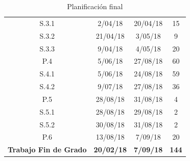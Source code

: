 \begin{table}[H]
\begin{tabular}{cccc}
\rowcolor[HTML]{FFFC9E} 
{\color[HTML]{333333} S.3.1}                                    & {\color[HTML]{333333} 2/04/18}           & {\color[HTML]{333333} 20/04/18}         & {\color[HTML]{333333} 15}               \\
\rowcolor[HTML]{FFFC9E} 
{\color[HTML]{333333} S.3.2}                                    & {\color[HTML]{333333} 21/04/18}          & {\color[HTML]{333333} 3/05/18}          & {\color[HTML]{333333} 9}                \\
\rowcolor[HTML]{FFFC9E} 
{\color[HTML]{333333} S.3.3}                                    & {\color[HTML]{333333} 9/04/18}           & {\color[HTML]{333333} 4/05/18}          & {\color[HTML]{333333} 20}               \\
\rowcolor[HTML]{67FD9A} 
P.4                                                             & 5/06/18                                  & 27/08/18                                & 60                                      \\
\rowcolor[HTML]{9AFF99} 
S.4.1                                                           & 5/06/18                                  & 24/08/18                                & 59                                      \\
\rowcolor[HTML]{9AFF99} 
S.4.2                                                           & 9/07/18                                  & 27/08/18                                & 36                                      \\
\rowcolor[HTML]{38FFF8} 
P.5                                                             & 28/08/18                                 & 31/08/18                                & 4                                       \\
\rowcolor[HTML]{96FFFB} 
S.5.1                                                           & 28/08/18                                 & 29/08/18                                & 2                                       \\
\rowcolor[HTML]{96FFFB} 
S.5.2                                                           & 30/08/18                                 & 31/08/18                                & 2                                       \\
\rowcolor[HTML]{96FFFB} 
P.6                                                             & 13/08/18                                 & 7/09/18                                 & 20                                      \\
\rowcolor[HTML]{000000} 
{\color[HTML]{FFFFFF} \textbf{Trabajo Fin de Grado}}            & {\color[HTML]{FFFFFF} \textbf{20/02/18}} & {\color[HTML]{FFFFFF} \textbf{7/09/18}} & {\color[HTML]{FFFFFF} \textbf{144}}    
\end{tabular}
\caption{Planificación final}
\label{tab:plan2}
\end{table}

